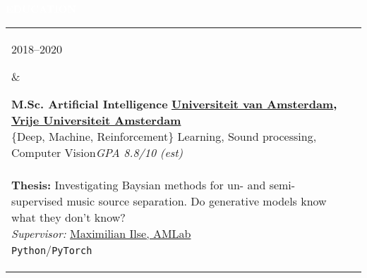 \documentclass{article}
\newcommand{\cvsect}[1]{
	\vspace{0.5\baselineskip}
	\colorbox{primary}{\textcolor{white}{\MakeUppercase{\textbf{#1}}}}\\
}
\newenvironment{entrylist}{
	\begin{longtable}[H]{l l}
}{
	\end{longtable}
}
\newcommand{\entry}[4]{%
	\parbox[t]{0.175\linewidth}{#1} &
	\parbox[t]{0.825\linewidth}{
		\textbf{#2}%
		\hfill%
		{\footnotesize \textbf{\textcolor{black}{#3}}}\\%
		{\small #4} %
    }\\\\}
\newcommand{\slashsep}{\hspace{2mm}/\hspace{2mm}}
\begin{document}
\cvsect{Education}
\begin{entrylist}
    \entry{2018--2020}
    {M.Sc. Artificial Intelligence}
    {\href{https://uva.nl}{Universiteit van Amsterdam}, \href{https://vu.nl}{Vrije Universiteit Amsterdam}}
    {
        \{Deep, Machine, Reinforcement\} Learning, Sound processing, Computer Vision\hfill\textit{GPA 8.8/10 \scriptsize{(est)}}\\
        \\
        \textbf{Thesis:} Investigating Baysian methods for un- and semi-supervised music source separation. Do generative models know what they don't know?\\
        \emph{Supervisor:} \href{https://scholar.google.com/citations?user=KNJIRGkAAAAJ}{Maximilian Ilse, AMLab}\\
        \texttt{Python}\slashsep\texttt{PyTorch}
    }

    \entry{2014--2017}
    {B.Sc. Applied Computer Science}
    {\href{https://www.uni-heidelberg.de/en}{University Heidelberg}}
    {
        \textit{Focus}: Image processing and pattern recognition\hfill\textit{GPA 3.48/4}\\
        \\
        \textbf{\href{https://github.com/morris-frank/ba_latex/blob/master/thesis.pdf}{Thesis:}} Using a FCN-ResNet based detector the thesis provides a reverse image search tool here in particular to retrieve art historic images containing an object given by a reference image.\\
        \emph{Supervisor:} \href{https://scholar.google.com/citations?user=ZrRs-qoAAAAJ}{Dr.\ Miguel Bautista Martin}, \href{https://hci.iwr.uni-heidelberg.de/Staff/bommer}{Prof.\ Dr.\ Björn Ommer}\\
        \texttt{Python}\slashsep\texttt{Caffe}\slashsep\texttt{Keras}\\
    }

    \entry{2013--2014}
    {B.Sc. Physics}
    {\href{https://www.uni-heidelberg.de/en}{University Heidelberg}}
    {Change of degree after the second semester, kept as minor studies}

\end{entrylist}
\end{document}
